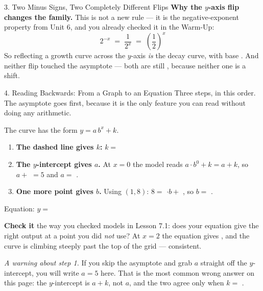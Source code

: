 \documentclass[10pt]{article}
\newcommand{\lgrid}[4]{%
  \draw[step=1, linegray!40, very thin] (#1,#3) grid (#2,#4);
  \draw[->, semithick, charcoal] (#1,0)--(#2,0) node[below right, font=\scriptsize]{$x$};
  \draw[->, semithick, charcoal] (0,#3)--(0,#4) node[left, font=\scriptsize]{$y$};}
\newcommand{\expgraph}[6]{\draw[very thick, forest, domain=#5:#6, samples=140, smooth]
  plot (\x,{(#1)*exp((#2)*((\x)-(#3)))+(#4)});}
\newcommand{\hasym}[3]{\draw[navy, dashed, semithick] (#1,#3)--(#2,#3);}
\begin{document}
\begin{notesbox}{3. Two Minus Signs, Two Completely Different Flips}
\vspace{2pt}
\textbf{Why the $y$-axis flip changes the family.} This is not a new rule --- it is the
negative-exponent property from Unit 6, and you already checked it in the Warm-Up:
\[
  2^{-x} \;=\; \frac{1}{2^{x}} \;=\; \left(\frac{1}{2}\right)^{x}
\]
So reflecting a growth curve across the $y$-axis \emph{is} the decay curve, with base
\blank{1.4cm}. And neither flip touched the asymptote --- both are still \blank{1.4cm}, because
neither one is a \blank{2.2cm} shift.
\end{notesbox}

\begin{notesbox}{4. Reading Backwards: From a Graph to an Equation}
Three steps, in this order. The asymptote goes first, because it is the only feature you can read
without doing any arithmetic.
\begin{center}
\begin{minipage}[c]{0.44\linewidth}
\centering
{}
\end{minipage}
\begin{minipage}[c]{0.52\linewidth}
\small
The curve has the form $y=a\,b^{x}+k$.
\begin{enumerate}[leftmargin=1.6em, itemsep=4pt]
  \item \textbf{The dashed line gives $k$:} \; $k=$ \blank{1.0cm}
  \item \textbf{The $y$-intercept gives $a$.} At $x=0$ the model reads $a\cdot b^{0}+k = a+k$, so
        $a+$ \blank{0.8cm} $=5$ and $a=$ \blank{1.0cm}.
  \item \textbf{One more point gives $b$.} Using $(1,8)$: \; $8=$ \blank{0.8cm}$\cdot b+$
        \blank{0.8cm}, so $b=$ \blank{1.0cm}.
\end{enumerate}
Equation: $y=$ \blank{3.0cm}
\end{minipage}
\end{center}

\vspace{2pt}
\textbf{Check it} the way you checked models in Lesson 7.1: does your equation give the right output
at a point you did \emph{not} use? At $x=2$ the equation gives \blank{2.2cm}, and the curve is
climbing steeply past the top of the grid --- consistent.

\vspace{3pt}
\emph{A warning about step 1.} If you skip the asymptote and grab $a$ straight off the $y$-intercept,
you will write $a=5$ here. That is the most common wrong answer on this page: the $y$-intercept is
$a+k$, not $a$, and the two agree only when $k=$ \blank{1.0cm}.
\end{notesbox}
\end{document}
